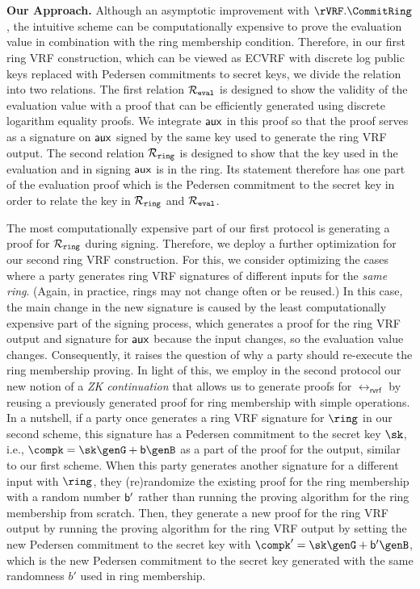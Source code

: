 \\\\
\noindent \textbf{Our Approach.} Although an asymptotic improvement with $ \rVRF.\CommitRing $, 
the intuitive scheme can be computationally expensive to prove the evaluation value in combination with the ring membership condition. Therefore, in our first ring VRF construction, which can be viewed as ECVRF with discrete log public keys replaced with Pedersen commitments to secret keys, we divide the relation into two relations. The first relation $ \mathcal{R}_{\mathtt{eval}} $ is designed  to show the validity of the evaluation value with a proof that can be efficiently generated using discrete logarithm equality proofs.  We integrate $ \mathsf{aux} $ in this proof so that the proof serves as a signature on $ \mathsf{aux} $ signed by the same key used to generate the ring VRF output.   The second relation $ \mathcal{R}_{\mathtt{ring}} $ is designed to show that the key used in the evaluation and in signing $ \mathsf{aux} $ is in the ring. Its statement therefore has one part of the evaluation proof which is the Pedersen commitment to the secret key in order to relate the key in $ \mathcal{R}_{\mathtt{ring}} $ and $ \mathcal{R}_{\mathtt{eval}} $.

The most computationally expensive part of our first protocol is generating a proof for $ \mathcal{R}_{\mathtt{ring}} $ during signing. Therefore, we deploy a further optimization for our second ring VRF construction. For this,  we consider optimizing the cases where a party generates ring VRF signatures of different inputs for the \emph{same ring}. (Again, in practice, rings may not change often or be reused.) In this case, the main change in the new signature is caused by the least computationally expensive part of the signing process, which generates a proof for the ring VRF output and signature for $ \mathsf{aux} $  because the input changes, so the evaluation value changes.  Consequently, it raises the question of why a party should re-execute the ring membership proving.  In light of this, we employ in the second protocol our  new notion of a \emph{ZK continuation} that allows us to generate proofs for $ \rel_{\mathsf{rvrf}} $ by reusing a previously generated proof for ring membership with simple operations. 
In a nutshell, if a party once generates a ring VRF signature for $ \ring $ in our second scheme, this signature has a  Pedersen commitment to the secret key $ \sk $, i.e., $ \compk = \sk \genG + \openpk \genB $ as a part of the proof for the output, similar to our first scheme.  When this party generates another signature for a different input  with $ \ring $, they (re)randomize the  existing proof for the ring membership with a random number $ \mathsf{b}' $ rather than  running the proving algorithm for the ring membership from scratch. Then, they generate a new proof for the ring VRF output by running the proving algorithm for the ring VRF output by setting the new Pedersen commitment to the secret key with $ \compk' = \sk \genG + \openpk'\genB $, which is the new  Pedersen commitment to the secret key generated  with the same randomness $ b' $ used in ring membership.



